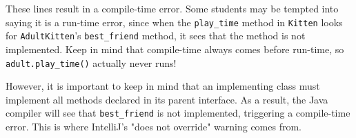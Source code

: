 \begin{parts}
\begin{blocksection}
\begin{solution}[0.5in]
These lines result in a compile-time error. Some students may be tempted into saying it is a run-time error,
since when the \lstinline{play_time} method in \lstinline{Kitten} looks for \lstinline{AdultKitten}'s \lstinline{best_friend} method,
it sees that the method is not implemented. Keep in mind that compile-time always comes before run-time, so \lstinline{adult.play_time()} actually never runs!

However, it is important to keep in mind that an implementing class must implement all methods declared in its parent interface.
As a result, the Java compiler will see that \lstinline{best_friend} is not implemented, triggering a compile-time error.
This is where IntelliJ's "does not override" warning comes from.
\end{solution}
\end{blocksection}

\end{parts}
